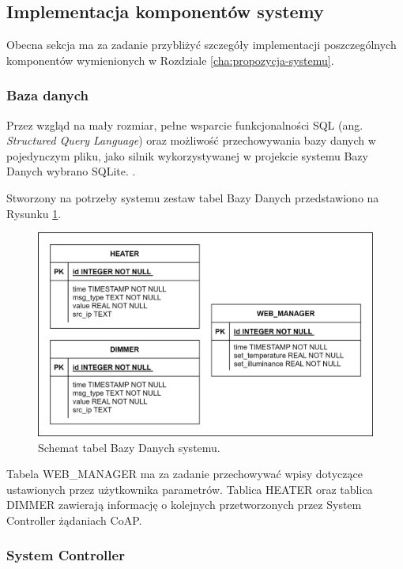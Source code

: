     \subsection{Implementacja komponentów systemy}

        Obecna sekcja ma za zadanie przybliżyć szczegóły implementacji poszczególnych komponentów wymienionych w Rozdziale \ref{cha:propozycja-systemu}.

        \subsubsection{Baza danych}
            Przez wzgląd na mały rozmiar, pełne wsparcie funkcjonalności SQL (ang. \textit{Structured Query Language}) oraz możliwość przechowywania bazy danych w pojedynczym pliku, jako silnik wykorzystywanej w projekcie systemu Bazy Danych wybrano SQLite. \cite{sqlite}.

            Stworzony na potrzeby systemu zestaw tabel Bazy Danych przedstawiono na Rysunku \ref{fig:db-diagram}.

            \begin{figure}[H]
                \centering
                \includegraphics[width=0.8\linewidth]{graphics/db_diagram.png}
                \caption{Schemat tabel Bazy Danych systemu.}
                \label{fig:db-diagram}
            \end{figure}

            Tabela WEB\_MANAGER ma za zadanie przechowywać wpisy dotyczące ustawionych przez użytkownika parametrów. Tablica HEATER oraz tablica DIMMER zawierają informację o kolejnych przetworzonych przez System Controller żądaniach CoAP.
    
        \subsubsection{System Controller}
    
